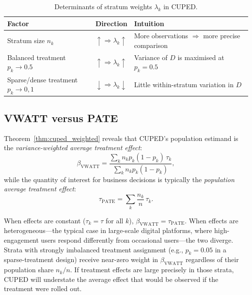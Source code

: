 \documentclass[12pt]{article}
\theoremstyle{plain}
\theoremstyle{definition}
\newcommand{\PATE}{\text{PATE}}
\newcommand{\VWATT}{\text{VWATT}}
\begin{document}
\begin{table}[htbp]
\centering
\caption{Determinants of stratum weights $\lambda_k$ in CUPED.}
\label{tab:weights}
\small
\begin{tabular}{lll}
\toprule
\textbf{Factor} & \textbf{Direction}
  & \textbf{Intuition} \\
\midrule
Stratum size $n_k$
  & $\uparrow \Rightarrow \lambda_k \uparrow$
  & More observations $\Rightarrow$ more precise comparison \\
Balanced treatment $p_k \to 0.5$
  & $\uparrow \Rightarrow \lambda_k \uparrow$
  & Variance of $D$ is maximised at $p_k = 0.5$ \\
Sparse/dense treatment $p_k \to 0,1$
  & $\downarrow \Rightarrow \lambda_k \downarrow$
  & Little within-stratum variation in $D$ \\
\bottomrule
\end{tabular}
\end{table}

\subsection{VWATT versus PATE}
\label{sec:vwatt_pate}

Theorem~\ref{thm:cuped_weighted} reveals that CUPED's population estimand is
the \emph{variance-weighted average treatment effect}:
\begin{equation}
  \beta_{\VWATT} = \frac{\sum_k n_k p_k(1-p_k)\,\tau_k}
                        {\sum_k n_k p_k(1-p_k)},
  \label{eq:vwatt}
\end{equation}
while the quantity of interest for business decisions is typically the
\emph{population average treatment effect}:
\begin{equation}
  \tau_{\PATE} = \sum_k \frac{n_k}{n}\,\tau_k.
  \label{eq:pate}
\end{equation}

When effects are constant ($\tau_k = \tau$ for all $k$), $\beta_{\VWATT} =
\tau_{\PATE}$.
When effects are heterogeneous---the typical case in large-scale digital
platforms, where high-engagement users respond differently from occasional
users---the two diverge.
Strata with strongly imbalanced treatment assignment (e.g., $p_k = 0.05$
in a sparse-treatment design) receive near-zero weight in $\beta_{\VWATT}$
regardless of their population share $n_k/n$.
If treatment effects are large precisely in those strata, CUPED will
understate the average effect that would be observed if the treatment were
rolled out.
\end{document}
